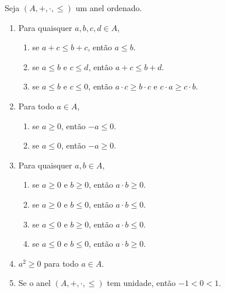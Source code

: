 \begin{proposition}
    Seja $(A, +, \cdot, \leq)$ um anel ordenado.
        \begin{enumerate}[leftmargin=*, align=left, label=\textbf{(\alph*)}]
            \item Para quaisquer $a, b, c, d \in A$,
                \begin{enumerate}[label=\roman*.]
                    \item se $a + c \leq b + c$, então $a \leq b$.
                    \item se $a \leq b$ e $c \leq d$, então $a+c \leq b+d$.
                    \item se $a \leq b$ e $c \leq 0$, então $a \cdot c \geq b \cdot c$ e $c \cdot a \geq c \cdot b$.
                \end{enumerate}
            \item Para todo $a \in A$,
                \begin{enumerate}[label=\roman*.]
                    \item se $a \geq 0$, então $-a \leq 0$.
                    \item se $a \leq 0$, então $-a \geq 0$.
                \end{enumerate}
            \item Para quaisquer $a, b \in A$,
                \begin{enumerate}[label=\roman*.]
                    \item se $a \geq 0$ e $b \geq 0$, então $a \cdot b \geq 0$.
                    \item se $a \geq 0$ e $b \leq 0$, então $a \cdot b \leq 0$.
                    \item se $a \leq 0$ e $b \geq 0$, então $a \cdot b \leq 0$.
                    \item se $a \leq 0$ e $b \leq 0$, então $a \cdot b \geq 0$.
                \end{enumerate}
            \item $a^2 \geq 0$ para todo $a \in A$.
            \item Se o anel $(A, +, \cdot, \leq)$ tem unidade, então $-1 < 0 < 1$.
        \end{enumerate}
\end{proposition}

